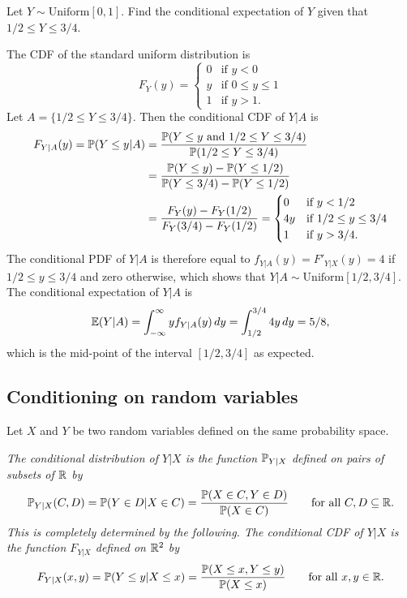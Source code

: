 \begin{example}
Let $Y\sim\text{Uniform}[0,1]$. Find the conditional expectation of $Y$ given that $1/2\leq Y\leq 3/4$.
\begin{solution}
The CDF of the standard uniform distribution is
\[
F_Y(y) = \begin{cases}
	0	& \text{if $y < 0$} \\
	y	& \text{if $0 \leq y \leq 1$} \\
	1	& \text{if $y > 1$.}
\end{cases}
\]
Let $A=\{1/2\leq Y\leq 3/4\}$. Then the conditional CDF of $Y|A$ is
\begin{align*}
F_{Y|A}(y) = \mathbb{P}(Y\leq y|A)
	& = \frac{\mathbb{P}(Y\leq y\text{ and }1/2\leq Y\leq 3/4)}{\mathbb{P}(1/2\leq Y\leq 3/4)} \\
	& = \frac{\mathbb{P}(Y\leq y)-\mathbb{P}(Y\leq 1/2)}{\mathbb{P}(Y\leq 3/4)-\mathbb{P}(Y\leq 1/2)} \\
	& = \frac{F_Y(y)-F_Y(1/2)}{F_Y(3/4)-F_Y(1/2)} 
	= \begin{cases}
    	0	& \text{if $y < 1/2$} \\
    	4y	& \text{if $1/2 \leq y \leq 3/4$} \\
    	1	& \text{if $y > 3/4$.}
    \end{cases}
\end{align*}
The conditional PDF of $Y|A$ is therefore equal to $f_{Y|A}(y) = F'_{Y|X}(y) = 4$ if $1/2\leq y\leq 3/4$ and zero otherwise, which shows that $Y|A\sim\text{Uniform}[1/2,3/4]$. The conditional expectation of $Y|A$ is 
\[
\mathbb{E}(Y|A) 
	= \int_{-\infty}^{\infty} y f_{Y|A}(y)\,dy
	= \int_{1/2}^{3/4} 4y \,dy
	= 5/8,
\]
which is the mid-point of the interval $[1/2,3/4]$ as expected.
\end{solution}
\end{example}

\subsection{Conditioning on random variables}
Let $X$ and $Y$ be two random variables defined on the same probability space.

\begin{definition}
\ben
\it The conditional distribution of $Y|X$ is the function $\mathbb{P}_{Y|X}$ defined on pairs of subsets of $\mathbb{R}$ by
\[
\mathbb{P}_{Y|X}(C,D) = \mathbb{P}(Y\in D|X\in C) = \frac{\mathbb{P}(X\in C, Y\in D)}{\mathbb{P}(X\in C)}\qquad\text{for all $C,D\subseteq\mathbb{R}$}.
\]
This is completely determined by the following.
\it The conditional CDF of $Y|X$ is the function $F_{Y|X}$ defined on $\mathbb{R}^2$ by
\[
F_{Y|X}(x,y) = \mathbb{P}(Y\leq y|X\leq x) = \frac{\mathbb{P}(X\leq x, Y\leq y)}{\mathbb{P}(X\leq x)}\qquad\text{for all $x,y\in\mathbb{R}$}.
\]
\een
\end{definition}

